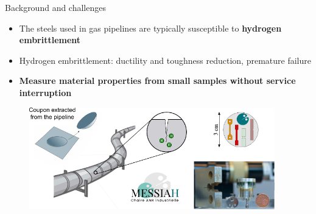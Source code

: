 \documentclass[9pt]{beamer}
\begin{document}
\begin{frame}{Background and challenges}

\begin{itemize}
	\item The steels used in gas pipelines are typically susceptible to \textbf{hydrogen embrittlement}
	\vspace{0.15cm}
	\item Hydrogen embrittlement: ductility and toughness reduction, premature failure
	\vspace{0.15cm}
	\item \textbf{Measure material properties from small samples without service interruption}
\end{itemize}

\vspace{0.15cm}

\begin{figure}
	\centering
	\includegraphics[width=0.95\textwidth]{Images/MESSIAH.pdf}
\end{figure}

\end{frame}

\end{document}
